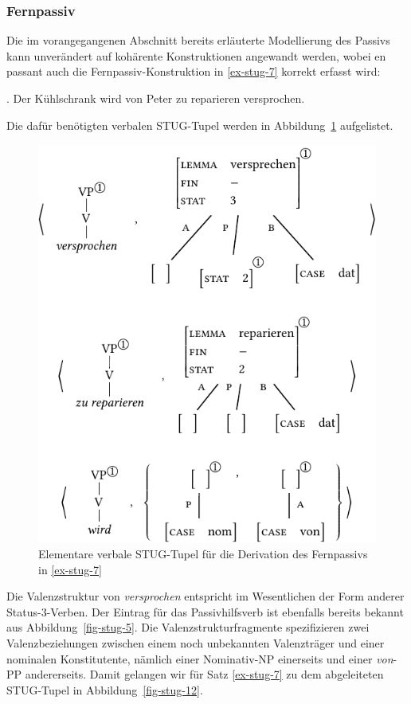 \subsubsection*{Fernpassiv}

Die im vorangegangenen Abschnitt bereits erläuterte Modellierung des Passivs kann unverändert auf kohärente Konstruktionen angewandt werden, wobei en passant auch die Fernpassiv-Konstruktion in \ref{ex-stug-7} korrekt erfasst wird:

\ex. \label{ex-stug-7} Der Kühlschrank wird von Peter zu reparieren versprochen.

Die dafür benötigten verbalen STUG-Tupel werden in Abbildung~\ref{fig-stug-11} aufgelistet.
\begin{figure}[t]
\centering
\includegraphics{graphics/abb99.pdf}
\caption{\label{fig-stug-11}Elementare verbale STUG-Tupel für die Derivation des Fernpassivs in \ref{ex-stug-7}}
\end{figure} 
Die Valenzstruktur von {\it versprochen} entspricht im Wesentlichen der Form anderer Status-3-Verben. Der Eintrag für das Passivhilfsverb ist ebenfalls bereits bekannt aus Abbildung~\ref{fig-stug-5}. Die Valenzstrukturfragmente spezifizieren zwei Valenzbeziehungen zwischen einem noch unbekannten Valenzträger und einer nominalen Konstitutente, nämlich einer Nominativ-NP einerseits und einer \emph{von}-PP andererseits. Damit gelangen wir für Satz \ref{ex-stug-7} zu dem abgeleiteten STUG-Tupel in Abbildung~\ref{fig-stug-12}.
